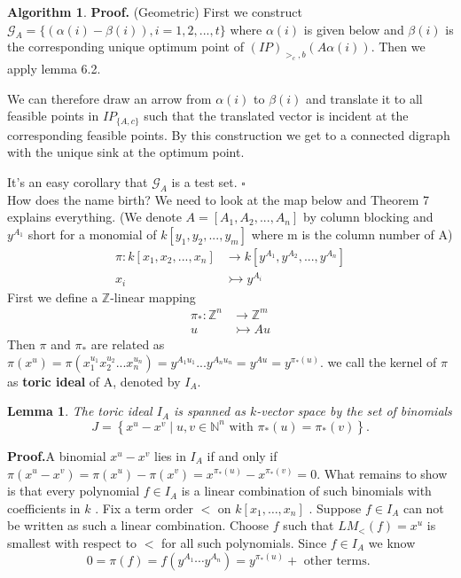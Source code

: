 \documentclass{article}
\theoremstyle{plain}
\newtheorem{lemma}[theorem]{Lemma}
\theoremstyle{definition}
\newtheorem{algorithm}[theorem]{Algorithm}
\begin{document}
\begin{algorithm}
\noindent\textbf{Proof.} (Geometric)  First we construct $\mathcal{G}_{A}=\{(\alpha(i)-\beta(i)),i=1,2,...,t\}$ where $\alpha(i)$ is given below and $\beta(i)$ is the corresponding unique optimum point of $(IP)_{>_c,b}(A \alpha (i))$.  Then we apply lemma 6.2.

We can therefore draw an arrow from $\alpha(i)$ to $\beta(i)$ and translate it to all feasible points in $IP_{\{A,c\}}$ such that the translated vector is incident at the corresponding feasible points. By this construction we get to a connected digraph with the unique sink at the optimum point. 

It's an easy corollary that $\mathcal{G}_{A}$ is a test set. \hfill $\square$ \\

How does the name birth? We need to look at the map below and Theorem 7 explains everything. (We denote $A=[A_1,A_2,...,A_n]$ by column blocking and $y^{A_1}$ short for a monomial of $k[y_1,y_2,...,y_m]$ where m is the column number of A)
\begin{align*}
\pi:  k[x_1,x_2,...,x_n] & \to k[y^{A_1},y^{A_2},...,y^{A_n}] \\
 x_{i} & \rightarrowtail y^{A_i}
\end{align*}
First we define a $\mathbb{Z}$-linear mapping
\begin{align*}
 \pi_*:  \mathbb{Z}^{n} & \to\mathbb{Z}^{m} \\
 u & \rightarrowtail  Au
\end{align*}
Then $\pi$ and $\pi_*$ are related as $\pi(x^u)=\pi(x_{1}^{u_1}x_{2}^{u_2}...x_{n}^{u_n})=y^{A_1 u_1}...y^{A_n u_n}=y^{A u}=y^{\pi_*(u)}$.
 we call the kernel of $\pi$ as \textbf{toric ideal} of A, denoted by $I_A$. \\
 
 \begin{lemma}The toric ideal  $I_{A}$  is spanned as  $k$-vector space by the set of binomials  $$J=\left\{x^{u}-x^{v} \mid u, v \in \mathbb{N}^{n} \text { with } \pi_* (u)=\pi_* (v)\right\}. $$ \end{lemma}
 
\noindent\textbf{Proof.}A binomial  $x^{u}-x^{v}$  lies in $ I_{A}$  if and only if  $\pi\left(x^{u}-x^{v}\right)=\pi\left(x^{u}\right)-\pi\left(x^{v}\right)=   x^{\pi_*(u)}-x^{\pi_*(v)}=0$. What remains to show is that every polynomial  $f \in I_{A}$  is a linear combination of such binomials with coefficients in  $k$ . Fix a term order  $<$  on $ k\left[x_{1}, \ldots, x_{n}\right]$ . Suppose $ f \in I_{A} $ can not be written as such a linear combination. Choose $ f $ such that  $L M_{<}(f)=x^{u}$  is smallest with respect to  $<$  for all such polynomials. Since  $f \in I_{A}$  we know
$$0=\pi(f)=f\left(y^{A_{1}} \cdots y^{A_{n}}\right)=y^{\pi_*(u)}+\text { other terms. }$$


\end{algorithm}
\end{document}
